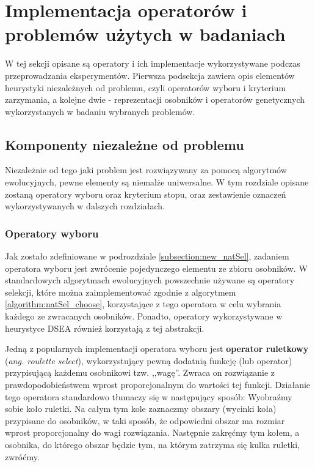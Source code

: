 \documentclass[./FM_mgr.tex]{subfiles}
\begin{document}
	\section{Implementacja operatorów i problemów użytych w badaniach} \label{appendix:impl_det}
	
	
	W tej sekcji opisane są operatory i ich implementacje wykorzystywane podczas przeprowadzania eksperymentów. 
	Pierwsza podsekcja zawiera opis elementów heurystyki niezależnych od problemu, czyli operatorów wyboru i kryterium zarzymania, a kolejne dwie - reprezentacji osobników i operatorów genetycznych wykorzystanych w badaniu wybranych problemów.
	
	\subsection{Komponenty niezależne od problemu} \label{subsection:independent_impl}
	
	Niezależnie od tego jaki problem jest rozwiązywany za pomocą algorytmów ewolucyjnych, pewne elementy są niemalże uniwersalne. 
	W tym rozdziale opisane zostaną operatory wyboru oraz kryterium stopu, oraz zestawienie oznaczeń wykorzystywanych w dalszych rozdziałach.
	
	\subsubsection{Operatory wyboru}
	
	Jak zostało zdefiniowane w podrozdziale \ref{subsection:new_natSel}, zadaniem operatora wyboru jest zwrócenie pojedynczego elementu ze zbioru osobników.
	W standardowych algorytmach ewolucyjnych powszechnie używane są operatory selekcji, które można zaimplementować zgodnie z algorytmem \ref{algorithm:natSel_choose}, korzystające z tego operatora w celu wybrania każdego ze zwracanych osobników.
	Ponadto, operatory wykorzystywane w heurystyce DSEA również korzystają z tej abstrakcji.
	
	Jedną z popularnych implementacji operatora wyboru jest \textbf{operator ruletkowy} (\emph{ang. roulette select}), wykorzystujący pewną dodatnią funkcję (lub operator) przypisującą każdemu osobnikowi tzw. ,,wagę''.
	Zwraca on rozwiązanie z prawdopodobieństwem wprost proporcjonalnym do wartości tej funkcji.
	Działanie tego operatora standardowo tłumaczy się w następujący sposób:
	Wyobraźmy sobie koło ruletki. 
	Na całym tym kole zaznaczmy obszary (wycinki koła) przypisane do osobników, w taki sposób, że odpowiedni obszar ma rozmiar wprost proporcjonalny do wagi rozwiązania. 
	Następnie zakręćmy tym kołem, a osobnika, do którego obszar będzie tym, na którym zatrzyma się kulka ruletki, zwróćmy.
	
\end{document}
